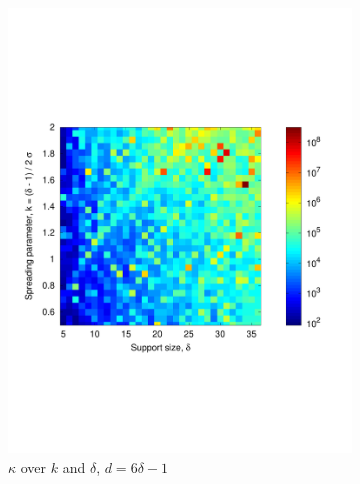 \begin{figure}
  \begin{subfigure}[b]{.49\textwidth}
    \centering
    \includegraphics[width=\textwidth,trim={.4in 2.5in .8in 2.5in}]{figs/gaustable}
    \caption{$\kappa$ over $k$ and $\delta$, $d = 6 \delta - 1$}
    \label{fig:gaustable}
  \end{subfigure}
  \begin{subfigure}[b]{.49\textwidth}
    \centering

\end{subfigure}
\end{figure}
